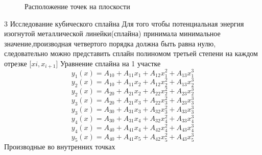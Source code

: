 \documentclass[russian,utf8,nocolumnxxxi,nocolumnxxxii]{eskdtext}
\begin{document}
\begin{figure}[!ht]
    \centering
{}
\caption{Расположение точек на плоскости}
    \label{fig:my_label}
\end{figure}
3 Исследование кубического сплайна
Для того чтобы потенциальная энергия изогнутой металлической линейки(сплайна) принимала минимальное значение,производная четвертого порядка должна быть равна нулю, следовательно можно представить сплайн полиномом третьей степени на каждом отрезке [$xi, x_{i+1}$]
Уравнение сплайна на 1 участке
\begin{equation}
y_1(x) =A_{10}+A_{11}x_1+A_{12}x^2_1+A_{13}x^3_1
\end{equation}
\begin{equation}
y_2(x) =A_{10}+A_{11}x_2+A_{12}x^2_2+A_{13}x^3_2
\end{equation}
\begin{equation}
y_2(x) =A_{20}+A_{21}x_2+A_{22}x^2_2+A_{23}x^3_2
\end{equation}
\begin{equation}
y_3(x) =A_{20}+A_{21}x_3+A_{22}x^2_3+A_{23}x^3_3
\end{equation}
\begin{equation}
y_3(x) =A_{30}+A_{31}x_3+A_{32}x^2_3+A_{33}x^3_3
\end{equation}
\begin{equation}
y_4(x) =A_{30}+A_{31}x_4+A_{32}x^2_4+A_{33}x^3_4
\end{equation}
\begin{equation}
y_4(x) =A_{40}+A_{41}x_4+A_{42}x^2_4+A_{43}x^3_4
\end{equation}
\begin{equation}
y_5(x) =A_{40}+A_{41}x_5+A_{42}x^2_5+A_{43}x^3_5
\end{equation}
Производные во внутренних точках
\end{document}
